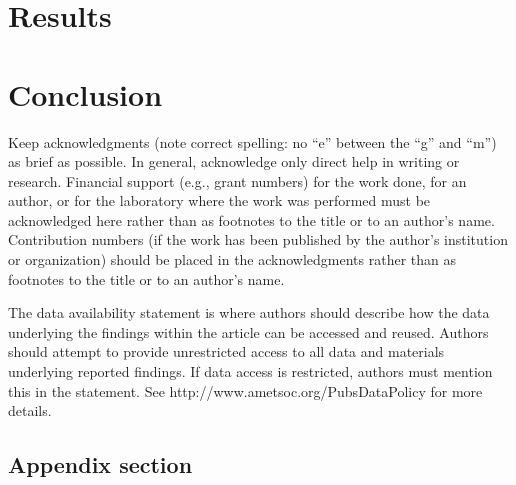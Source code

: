 \documentclass{ametsocV6.1}
\begin{document}
\section{Results}

\section{Conclusion}

\clearpage
\acknowledgments
Keep acknowledgments (note correct spelling: no ``e'' between the ``g'' and
``m'') as brief as possible. In general, acknowledge only direct help in
writing or research. Financial support (e.g., grant numbers) for the work done, 
for an author, or for the laboratory where the work was performed must be 
acknowledged here rather than as footnotes to the title or to an author's name.
Contribution numbers (if the work has been published by the author's institution 
or organization) should be placed in the acknowledgments rather than as 
footnotes to the title or to an author's name.

\datastatement
The data availability statement is where authors should describe how the data underlying 
the findings within the article can be accessed and reused. Authors should attempt to 
provide unrestricted access to all data and materials underlying reported findings. 
If data access is restricted, authors must mention this in the statement.
See http://www.ametsoc.org/PubsDataPolicy for more details.



\appendix[A] 


\subsection*{Appendix section}






\end{document}
